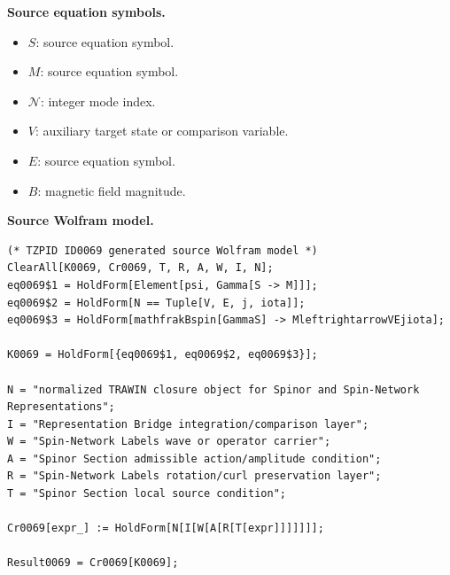 \begin{minipage}[t]{0.49\linewidth}
\begingroup
\small
\raggedright
\textbf{Source equation symbols.}\par
\begin{itemize}[leftmargin=1.35em,itemsep=1pt,topsep=1pt,parsep=0pt]
    \item $S$: source equation symbol.
    \item $M$: source equation symbol.
    \item $\mathcal{N}$: integer mode index.
    \item $V$: auxiliary target state or comparison variable.
    \item $E$: source equation symbol.
    \item $B$: magnetic field magnitude.
\end{itemize}
\endgroup
\end{minipage}\hfill
\begin{minipage}[t]{0.47\linewidth}
\begingroup
\scriptsize
\raggedright
\textbf{Source Wolfram model.}\par
\begin{Verbatim}[fontsize=\tiny,breaklines=true,breakanywhere=true]
(* TZPID ID0069 generated source Wolfram model *)
ClearAll[K0069, Cr0069, T, R, A, W, I, N];
eq0069$1 = HoldForm[Element[psi, Gamma[S -> M]]];
eq0069$2 = HoldForm[N == Tuple[V, E, j, iota]];
eq0069$3 = HoldForm[mathfrakBspin[GammaS] -> MleftrightarrowVEjiota];

K0069 = HoldForm[{eq0069$1, eq0069$2, eq0069$3}];

N = "normalized TRAWIN closure object for Spinor and Spin-Network Representations";
I = "Representation Bridge integration/comparison layer";
W = "Spin-Network Labels wave or operator carrier";
A = "Spinor Section admissible action/amplitude condition";
R = "Spin-Network Labels rotation/curl preservation layer";
T = "Spinor Section local source condition";

Cr0069[expr_] := HoldForm[N[I[W[A[R[T[expr]]]]]]];

Result0069 = Cr0069[K0069];
\end{Verbatim}
\endgroup
\end{minipage}

